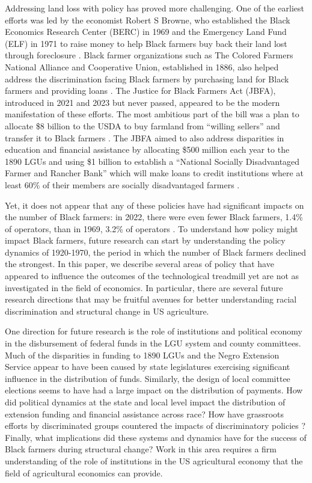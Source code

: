 \documentclass[12pt]{article}
\begin{document}
Addressing land loss with policy has proved more challenging.
One of the earliest efforts was led by the economist Robert S Browne, who established the Black Economics Research Center (BERC) in 1969 and the Emergency Land Fund (ELF) in 1971 to raise money to help Black farmers buy back their land lost through foreclosure \citep{handy_emergence_2008}. 
Black farmer organizations such as The Colored Farmers National Alliance and Cooperative Union, established in 1886, also helped address the discrimination facing Black farmers by purchasing land for Black farmers and providing loans \citep{white_freedom_2019}. 
The Justice for Black Farmers Act (JBFA), introduced in 2021 and 2023 but never passed, appeared to be the modern manifestation of these efforts.
The most ambitious part of the bill was a plan to allocate \$8 billion to the USDA to buy farmland from “willing sellers” and transfer it to Black farmers \citep{booker_justice_2023}. 
The JBFA aimed to also address disparities in education and financial assistance by allocating \$500 million each year to the 1890 LGUs and using \$1 billion to establish a “National Socially Disadvantaged Farmer and Rancher Bank” which will make loans to credit institutions where at least 60\% of their members are socially disadvantaged farmers \citep{booker_justice_2023}.

Yet, it does not appear that any of these policies have had significant impacts on the number of Black farmers: in 2022, there were even fewer Black farmers, 1.4\% of operators, than in 1969, 3.2\% of operators \citep{USDA_black_farmers}. 
To understand how policy might impact Black farmers, future research can start by understanding the policy dynamics of 1920-1970, the period in which the number of Black farmers declined the strongest. 
In this paper, we describe several areas of policy that have appeared to influence the outcomes of the technological treadmill yet are not as investigated in the field of economics.
In particular, there are several future research directions that may be fruitful avenues for better understanding racial discrimination and structural change in US agriculture.

One direction for future research is the role of institutions and political economy in the disbursement of federal funds in the LGU system and county committees.
Much of the disparities in funding to 1890 LGUs and the Negro Extension Service appear to have been caused by state legislatures exercising significant influence in the distribution of funds.
Similarly, the design of local committee elections seems to have had a large impact on the distribution of payments.
How did political dynamics at the state and local level impact the distribution of extension funding and financial assistance across race?
How have grassroots efforts by discriminated groups countered the impacts of discriminatory policies \citep{smith_ii_food_2023,white_freedom_2019}? 
Finally, what implications did these systems and dynamics have for the success of Black farmers during structural change?
Work in this area requires a firm understanding of the role of institutions in the US agricultural economy that the field of agricultural economics can provide.
\end{document}
